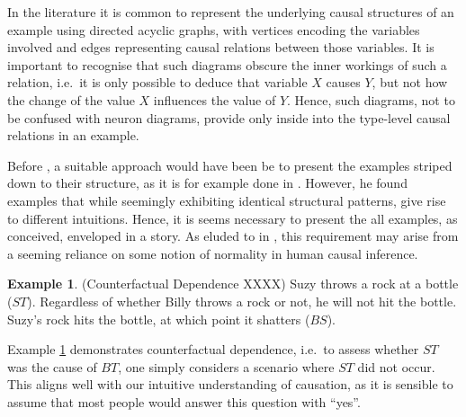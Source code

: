 \documentclass[11pt,a4paper]{book}
\theoremstyle{definition}
\theoremstyle{definition}
\newtheorem{example}{Example}[section]
\theoremstyle{definition}
\theoremstyle{remark}
\begin{document}
In the literature it is common to represent the underlying causal structures of an example using directed acyclic graphs, with vertices encoding the variables involved and edges representing causal relations between those variables.
It is important to recognise that such diagrams obscure the inner workings of such a relation, i.e.\ it is only possible to deduce that variable $X$ causes $Y$, but not how the change of the value $X$ influences the value of $Y$.
Hence, such diagrams, not to be confused with neuron diagrams, provide only inside into the type-level causal relations in an example. 

Before \cite{hiddleston2005causal}, a suitable approach would have been be to present the examples striped down to their structure, as it is for example done in \cite{hitchcock2009structural,baumgartner2013regularity}. However, 
he found examples that while seemingly exhibiting identical structural patterns, give rise to different intuitions. Hence, it is seems necessary to present the all examples, as conceived, enveloped in a story. 
As eluded to in \cite{baumgartner2013regularity,halpern2016actual,Weslake2015partialtheory}, this requirement may arise from a seeming reliance on some notion of normality in human causal inference.


\begin{example}(Counterfactual Dependence XXXX)
\label{ex:dependence}
Suzy throws a rock at a bottle ($ST$). Regardless of whether Billy throws a rock or not, he will not hit the bottle. Suzy’s rock hits the bottle, at which point it shatters ($BS$).
\begin{center}
\end{center}
\end{example}


Example \ref{ex:dependence} demonstrates counterfactual dependence, i.e.\ to assess whether $ST$ was the cause of $BT$, one simply considers a scenario where $ST$ did not occur.
This aligns well with our intuitive understanding of causation, as it is sensible to assume that most people would answer this question with ``yes''.
\end{document}
